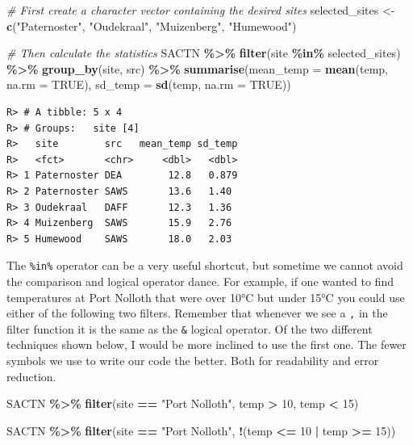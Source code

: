 \documentclass[
]{book}
\newenvironment{Shaded}{\begin{snugshade}}{\end{snugshade}}
\newcommand{\CommentTok}[1]{\textcolor[rgb]{0.56,0.35,0.01}{\textit{#1}}}
\newcommand{\DataTypeTok}[1]{\textcolor[rgb]{0.13,0.29,0.53}{#1}}
\newcommand{\DecValTok}[1]{\textcolor[rgb]{0.00,0.00,0.81}{#1}}
\newcommand{\KeywordTok}[1]{\textcolor[rgb]{0.13,0.29,0.53}{\textbf{#1}}}
\newcommand{\NormalTok}[1]{#1}
\newcommand{\OperatorTok}[1]{\textcolor[rgb]{0.81,0.36,0.00}{\textbf{#1}}}
\newcommand{\OtherTok}[1]{\textcolor[rgb]{0.56,0.35,0.01}{#1}}
\newcommand{\StringTok}[1]{\textcolor[rgb]{0.31,0.60,0.02}{#1}}
\begin{document}
\begin{Shaded}
\begin{Highlighting}[]
\CommentTok{\# First create a character vector containing the desired sites}
\NormalTok{selected\_sites <{-}}\StringTok{ }\KeywordTok{c}\NormalTok{(}\StringTok{"Paternoster"}\NormalTok{, }\StringTok{"Oudekraal"}\NormalTok{, }\StringTok{"Muizenberg"}\NormalTok{, }\StringTok{"Humewood"}\NormalTok{)}

\CommentTok{\# Then calculate the statistics}
\NormalTok{SACTN }\OperatorTok{\%>\%}\StringTok{ }
\StringTok{  }\KeywordTok{filter}\NormalTok{(site }\OperatorTok{\%in\%}\StringTok{ }\NormalTok{selected\_sites) }\OperatorTok{\%>\%}
\StringTok{  }\KeywordTok{group\_by}\NormalTok{(site, src) }\OperatorTok{\%>\%}\StringTok{ }
\StringTok{  }\KeywordTok{summarise}\NormalTok{(}\DataTypeTok{mean\_temp =} \KeywordTok{mean}\NormalTok{(temp, }\DataTypeTok{na.rm =} \OtherTok{TRUE}\NormalTok{), }
            \DataTypeTok{sd\_temp =} \KeywordTok{sd}\NormalTok{(temp, }\DataTypeTok{na.rm =} \OtherTok{TRUE}\NormalTok{))}
\end{Highlighting}
\end{Shaded}

\begin{verbatim}
R> # A tibble: 5 x 4
R> # Groups:   site [4]
R>   site        src   mean_temp sd_temp
R>   <fct>       <chr>     <dbl>   <dbl>
R> 1 Paternoster DEA        12.8   0.879
R> 2 Paternoster SAWS       13.6   1.40 
R> 3 Oudekraal   DAFF       12.3   1.36 
R> 4 Muizenberg  SAWS       15.9   2.76 
R> 5 Humewood    SAWS       18.0   2.03
\end{verbatim}

The \texttt{\%in\%} operator can be a very useful shortcut, but sometime we cannot avoid the comparison and logical operator dance. For example, if one wanted to find temperatures at Port Nolloth that were over 10°C but under 15°C you could use either of the following two filters. Remember that whenever we see a \texttt{,} in the filter function it is the same as the \texttt{\&} logical operator. Of the two different techniques shown below, I would be more inclined to use the first one. The fewer symbols we use to write our code the better. Both for readability and error reduction.

\begin{Shaded}
\begin{Highlighting}[]
\NormalTok{SACTN }\OperatorTok{\%>\%}\StringTok{ }
\StringTok{  }\KeywordTok{filter}\NormalTok{(site }\OperatorTok{==}\StringTok{ "Port Nolloth"}\NormalTok{, temp }\OperatorTok{>}\StringTok{ }\DecValTok{10}\NormalTok{, temp }\OperatorTok{<}\StringTok{ }\DecValTok{15}\NormalTok{)}

\NormalTok{SACTN }\OperatorTok{\%>\%}\StringTok{ }
\StringTok{  }\KeywordTok{filter}\NormalTok{(site }\OperatorTok{==}\StringTok{ "Port Nolloth"}\NormalTok{, }\OperatorTok{!}\NormalTok{(temp }\OperatorTok{<=}\StringTok{ }\DecValTok{10} \OperatorTok{|}\StringTok{ }\NormalTok{temp  }\OperatorTok{>=}\StringTok{ }\DecValTok{15}\NormalTok{))}
\end{Highlighting}
\end{Shaded}
\end{document}

